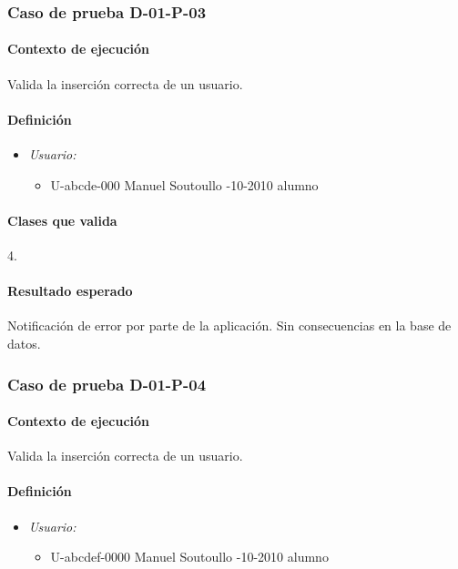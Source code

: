 \documentclass[10pt,a4paper]{article}
\begin{document}
			\subsubsection{Caso de prueba D-01-P-03}
			\paragraph{Contexto de ejecución} Valida la inserción correcta de un usuario.
				\paragraph{Definición}
				\begin{itemize}
					\item \textit{Usuario:}
					\begin{itemize}
						\item \textbar U-abcde-000 \textbar Manuel \textbar Soutoullo -10-2010 \textbar alumno \textbar
					\end{itemize}
				\end{itemize}
				\paragraph{Clases que valida} 4.
				\paragraph{Resultado esperado} Notificación de error por parte de la aplicación. Sin consecuencias en la base de datos.
			\subsubsection{Caso de prueba D-01-P-04}
			\paragraph{Contexto de ejecución} Valida la inserción correcta de un usuario.
				\paragraph{Definición}
				\begin{itemize}
					\item \textit{Usuario:}
					\begin{itemize}
						\item \textbar U-abcdef-0000 \textbar Manuel \textbar Soutoullo -10-2010 \textbar alumno \textbar
					\end{itemize}
				\end{itemize}
\end{document}
